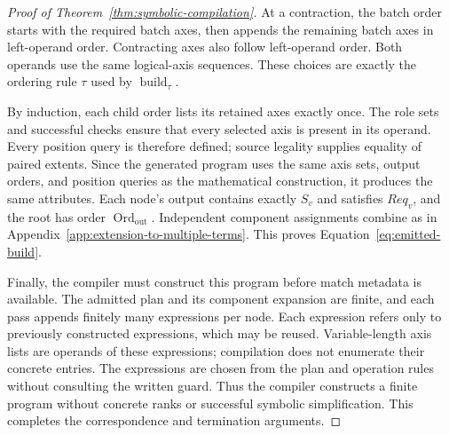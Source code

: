 \begin{proof}[Proof of Theorem~\ref{thm:symbolic-compilation}]
At a contraction, the batch order starts with the required batch axes,
then appends the remaining batch axes in left-operand order. Contracting
axes also follow left-operand order. Both operands use the same logical-axis
sequences. These choices are exactly the ordering rule $\tau$ used by
$\operatorname{build}_{\tau}$.

By induction, each child order lists its retained axes exactly once.
The role sets and successful checks ensure that every selected axis is
present in its operand. Every position query is therefore defined;
source legality supplies equality of paired extents. Since the generated
program uses the same axis sets, output orders, and position queries as the
mathematical construction, it produces the same attributes. Each node's
output contains exactly $S_v$ and satisfies $Req_v$, and the root has order
$\operatorname{Ord}_{\mathrm{out}}$. Independent component assignments combine as in
Appendix~\ref{app:extension-to-multiple-terms}. This proves Equation~\eqref{eq:emitted-build}.

Finally, the compiler must construct this program before match metadata
is available. The admitted plan and its component expansion are finite,
and each pass appends finitely many expressions per node. Each expression
refers only to previously constructed expressions, which may be reused.
Variable-length axis lists are operands of these expressions; compilation
does not enumerate their concrete entries. The expressions are chosen from
the plan and operation rules without consulting the written guard. Thus
the compiler constructs a finite program without concrete ranks or
successful symbolic simplification. This completes the correspondence
and termination arguments.
\end{proof}
